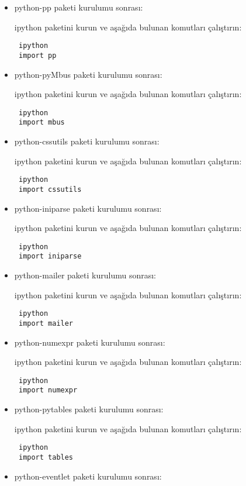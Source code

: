\documentclass[a4paper,10pt]{article}
\begin{document}
\begin{itemize}
\item python-pp paketi kurulumu sonrası:

ipython paketini kurun ve aşağıda bulunan komutları çalıştırın:
\begin{verbatim}
 ipython
 import pp
\end{verbatim}

\item python-pyMbus paketi kurulumu sonrası:

ipython paketini kurun ve aşağıda bulunan komutları çalıştırın:
\begin{verbatim}
 ipython
 import mbus
\end{verbatim}

\item python-cssutils paketi kurulumu sonrası:

ipython paketini kurun ve aşağıda bulunan komutları çalıştırın:
\begin{verbatim}
 ipython
 import cssutils
\end{verbatim}

\item python-iniparse paketi kurulumu sonrası:

ipython paketini kurun ve aşağıda bulunan komutları çalıştırın:
\begin{verbatim}
 ipython
 import iniparse
\end{verbatim}

\item python-mailer paketi kurulumu sonrası:

ipython paketini kurun ve aşağıda bulunan komutları çalıştırın:
\begin{verbatim}
 ipython
 import mailer
\end{verbatim}

\item python-numexpr paketi kurulumu sonrası:

ipython paketini kurun ve aşağıda bulunan komutları çalıştırın:
\begin{verbatim}
 ipython
 import numexpr
\end{verbatim}

\item python-pytables paketi kurulumu sonrası:

ipython paketini kurun ve aşağıda bulunan komutları çalıştırın:
\begin{verbatim}
 ipython
 import tables
\end{verbatim}

\item python-eventlet paketi kurulumu sonrası:


\end{itemize}
\end{document}
